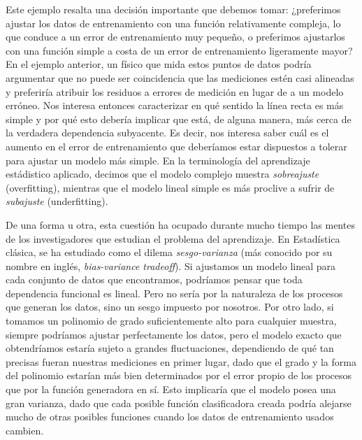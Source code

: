 \documentclass{report}
\begin{document}
Este ejemplo resalta una decisión importante que debemos tomar: ¿preferimos ajustar los datos de entrenamiento
con una función relativamente compleja, lo que conduce a un error de entrenamiento muy pequeño, o preferimos
ajustarlos con una función simple a costa de un error de entrenamiento ligeramente mayor? En el ejemplo
anterior, un físico que mida estos puntos de datos podría argumentar que no puede ser coincidencia que las mediciones
estén casi alineadas y preferiría atribuir los residuos a errores de medición en lugar de a un modelo erróneo. Nos interesa
entonces caracterizar en qué sentido la línea recta es más simple y por qué esto debería implicar que está, de
alguna manera, más cerca de la verdadera dependencia subyacente. Es decir, nos interesa saber cuál es el
aumento en el error de entrenamiento que deberíamos estar dispuestos a tolerar para ajustar un modelo más simple.
En la terminología del aprendizaje
estádistico aplicado, decimos que el modelo complejo muestra \textit{sobreajuste} (overfitting),
mientras que el modelo lineal simple es más proclive a sufrir de \textit{subajuste} (underfitting).

De una forma u otra, esta cuestión ha ocupado durante mucho tiempo las mentes de los investigadores que estudian
el problema del aprendizaje. En Estadística clásica, se ha estudiado como el dilema \textit{sesgo-varianza}
(más conocido por su nombre en inglés, \textit{bias-variance tradeoff}). Si ajustamos un modelo lineal para cada conjunto de datos que encontramos,
podríamos pensar que toda dependencia funcional es lineal. Pero no sería por la naturaleza de los procesos que
generan los datos, sino un sesgo impuesto por nosotros. Por otro lado,
si tomamos un polinomio de grado suficientemente alto para cualquier muestra, siempre podríamos ajustar
perfectamente los datos, pero el modelo exacto que obtendríamos estaría sujeto a grandes fluctuaciones, dependiendo
de qué tan precisas fueran nuestras mediciones en primer lugar, dado que el grado y la forma del polinomio estarían más
bien determinados por el error propio de los procesos que por la función generadora en sí. Esto implicaría que el modelo
posea una gran varianza, dado que cada posible función clasificadora creada podría alejarse mucho de otras posibles funciones
cuando los datos de entrenamiento usados cambien.
\end{document}
